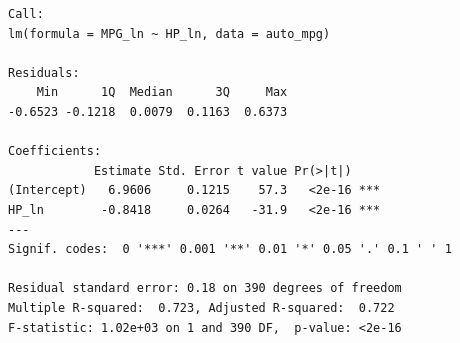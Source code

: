 \documentclass{beamer}\usepackage[]{graphicx}\usepackage[]{color}
\makeatletter
\newcommand{\hlnum}[1]{\textcolor[rgb]{0.824,0.412,0.118}{#1}}%
\newcommand{\hlstr}[1]{\textcolor[rgb]{1,0.894,0.71}{#1}}%
\newcommand{\hlopt}[1]{\textcolor[rgb]{1,0.894,0.769}{#1}}%
\newcommand{\hlstd}[1]{\textcolor[rgb]{1,0.894,0.769}{#1}}%
\newcommand{\hlkwc}[1]{\textcolor[rgb]{0.78,0.941,0.545}{#1}}%
\newcommand{\hlkwd}[1]{\textcolor[rgb]{1,0.78,0.769}{#1}}%
\newenvironment{kframe}{%
 \def\at@end@of@kframe{}%
 \ifinner\ifhmode%
  \def\at@end@of@kframe{\end{minipage}}%
  \begin{minipage}{\columnwidth}%
 \fi\fi%
 \def\FrameCommand##1{\hskip\@totalleftmargin \hskip-\fboxsep
 \colorbox{shadecolor}{##1}\hskip-\fboxsep
     \hskip-\linewidth \hskip-\@totalleftmargin \hskip\columnwidth}%
 \MakeFramed {\advance\hsize-\width
   \@totalleftmargin\z@ \linewidth\hsize
   \@setminipage}}%
 {\par\unskip\endMakeFramed%
 \at@end@of@kframe}
\newenvironment{knitrout}{}{} %
\makeatother
\begin{document}
\begin{darkframes}
\begin{frame}[fragile]
\begin{knitrout}
\begin{kframe}
\begin{verbatim}
Call:
lm(formula = MPG_ln ~ HP_ln, data = auto_mpg)

Residuals:
    Min      1Q  Median      3Q     Max 
-0.6523 -0.1218  0.0079  0.1163  0.6373 

Coefficients:
            Estimate Std. Error t value Pr(>|t|)    
(Intercept)   6.9606     0.1215    57.3   <2e-16 ***
HP_ln        -0.8418     0.0264   -31.9   <2e-16 ***
---
Signif. codes:  0 '***' 0.001 '**' 0.01 '*' 0.05 '.' 0.1 ' ' 1

Residual standard error: 0.18 on 390 degrees of freedom
Multiple R-squared:  0.723,	Adjusted R-squared:  0.722 
F-statistic: 1.02e+03 on 1 and 390 DF,  p-value: <2e-16
\end{verbatim}
\end{kframe}
\end{knitrout}
    \end{frame}
    
    
    
    
\end{darkframes}
\end{document}
